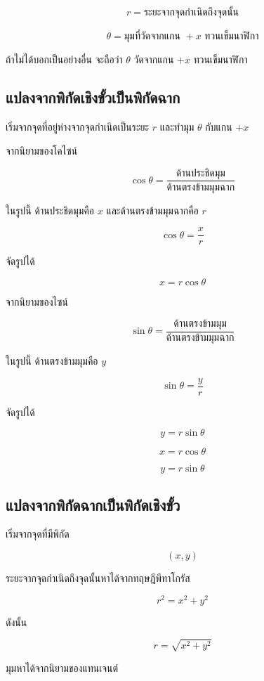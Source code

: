 \[
r=\text{ระยะจากจุดกำเนิดถึงจุดนั้น}
\]

\[
\theta=\text{มุมที่วัดจากแกน }+x\text{ ทวนเข็มนาฬิกา}
\]

\begin{tcolorbox}[title=ข้อกำหนดในเอกสารนี้]
ถ้าไม่ได้บอกเป็นอย่างอื่น จะถือว่า $\theta$ วัดจากแกน $+x$ ทวนเข็มนาฬิกา
\end{tcolorbox}

\subsection{แปลงจากพิกัดเชิงขั้วเป็นพิกัดฉาก}

เริ่มจากจุดที่อยู่ห่างจากจุดกำเนิดเป็นระยะ $r$ และทำมุม $\theta$ กับแกน $+x$

จากนิยามของโคไซน์

\[
\cos\theta=\frac{\text{ด้านประชิดมุม}}{\text{ด้านตรงข้ามมุมฉาก}}
\]

ในรูปนี้ ด้านประชิดมุมคือ $x$ และด้านตรงข้ามมุมฉากคือ $r$

\[
\cos\theta=\frac{x}{r}
\]

จัดรูปได้

\[
x=r\cos\theta
\]

จากนิยามของไซน์

\[
\sin\theta=\frac{\text{ด้านตรงข้ามมุม}}{\text{ด้านตรงข้ามมุมฉาก}}
\]

ในรูปนี้ ด้านตรงข้ามมุมคือ $y$

\[
\sin\theta=\frac{y}{r}
\]

จัดรูปได้

\[
y=r\sin\theta
\]

\begin{tcolorbox}[title={สูตรแปลงพิกัดเชิงขั้วเป็นพิกัดฉาก}]
\[
x=r\cos\theta
\]

\[
y=r\sin\theta
\]
\end{tcolorbox}

\subsection{แปลงจากพิกัดฉากเป็นพิกัดเชิงขั้ว}

เริ่มจากจุดที่มีพิกัด

\[
(x,y)
\]

ระยะจากจุดกำเนิดถึงจุดนั้นหาได้จากทฤษฎีพีทาโกรัส

\[
r^2=x^2+y^2
\]

ดังนั้น

\[
r=\sqrt{x^2+y^2}
\]

มุมหาได้จากนิยามของแทนเจนต์

